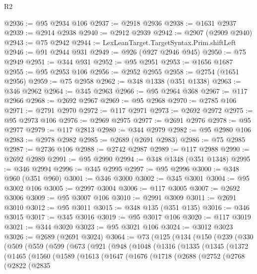 \begin{lexlean}{R2}
\begin{coremodule}
@2936 := @95 @2934 @106
@2937 := @2918 @2936
@2938 := @1631 @2937
@2939 := @2914 @2938
@2940 := @2912 @2939
@2942 := @2907 (@2909 @2940)
@2943 := @75 @2942
@2944 := LexLeanTarget.TargetSyntax.Prim.shiftLeft
@2946 := @91 @2944 @931
@2949 := @926 (@927 @2946 @945)
@2950 := @75 @2949
@2951 := @344 @931
@2952 := @95 @2951
@2953 := @1656 @1687
@2955 := @95 @2953 @106
@2956 := @2952 @2955
@2958 := @2754 (@1651 @2956)
@2959 := @75 @2958
@2962 := @348 @1338 (@351 @1338)
@2963 := @346 @2962
@2964 := @345 @2963
@2966 := @95 @2964 @368
@2967 := @117 @2966
@2968 := @2692 @2967
@2969 := @95 @2968
@2970 := @2785 @106
@2971 := @2791 @2970
@2972 := @117 @2971
@2973 := @2692 @2972
@2975 := @95 @2973 @106
@2976 := @2969 @2975
@2977 := @2691 @2976
@2978 := @95 @2977
@2979 := @117 @2813
@2980 := @344 @2979
@2982 := @95 @2980 @106
@2983 := @2978 @2982
@2985 := @2689 (@2691 @2983)
@2986 := @75 @2985
@2987 := @2736 @106
@2988 := @2742 @2987
@2989 := @117 @2988
@2990 := @2692 @2989
@2991 := @95 @2990
@2994 := @348 @1348 (@351 @1348)
@2995 := @346 @2994
@2996 := @345 @2995
@2997 := @95 @2996
@3000 := @348 @960 (@351 @960)
@3001 := @346 @3000
@3002 := @345 @3001
@3004 := @95 @3002 @106
@3005 := @2997 @3004
@3006 := @117 @3005
@3007 := @2692 @3006
@3009 := @95 @3007 @106
@3010 := @2991 @3009
@3011 := @2691 @3010
@3012 := @95 @3011
@3015 := @348 @135 (@351 @135)
@3016 := @346 @3015
@3017 := @345 @3016
@3019 := @95 @3017 @106
@3020 := @117 @3019
@3021 := @344 @3020
@3023 := @95 @3021 @106
@3024 := @3012 @3023
@3026 := @2689 (@2691 @3024)
@3064 := @73
    (@125
      (@134
        (@150
          (@239
            (@330
              (@509
                (@559
                  (@599
                    (@673
                      (@921
                        (@948
                          (@1048
                            (@1316
                              (@1335
                                (@1345
                                  (@1372
                                    (@1465
                                      (@1560
                                        (@1589
                                          (@1613
                                            (@1647
                                              (@1676
                                                (@1718
                                                  (@2688
                                                    (@2752
                                                      (@2768
                                                        (@2822
                                                          (@2835

\end{coremodule}
\end{lexlean}
